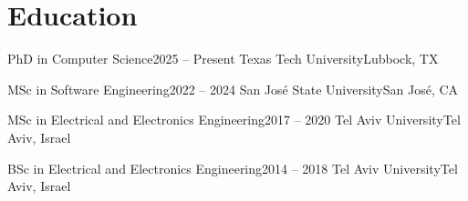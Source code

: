 
\section{Education}
    \resumeSubHeadingListStart

    \resumeSubheading
    {PhD in Computer Science}{2025 -- Present}
    {Texas Tech University}{Lubbock, TX}
    \resumeItemListStart
    \resumeItemListEnd

    \resumeSubheading
    {MSc in Software Engineering}{2022 -- 2024}
    {San Jos\'e State University}{San Jos\'e, CA}
    \resumeItemListStart
    \resumeItemListEnd

    \resumeSubheading
    {MSc in Electrical and Electronics Engineering}{2017 -- 2020}
    {Tel Aviv University}{Tel Aviv, Israel}
    \resumeItemListStart
    \resumeItemListEnd

    \resumeSubheading
    {BSc in Electrical and Electronics Engineering}{2014 -- 2018}
    {Tel Aviv University}{Tel Aviv, Israel}

    \resumeSubHeadingListEnd